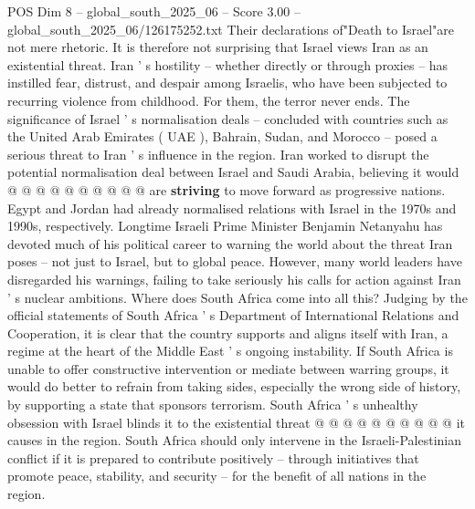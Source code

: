 \begin{textsample}{POS Dim 8 – global\_south\_2025\_06 – Score 3.00 – global\_south\_2025\_06/126175252.txt}
Their declarations of"Death to Israel"are not mere rhetoric.
It is therefore not surprising that Israel views Iran as an existential threat.
Iran ' s hostility -- whether directly or through proxies -- has instilled fear, distrust, and despair among Israelis, who have been subjected to recurring violence from childhood.
For them, the terror never ends.
The significance of Israel ' s normalisation deals -- concluded with countries such as the United Arab Emirates ( UAE ), Bahrain, Sudan, and Morocco -- posed a serious threat to Iran ' s influence in the region.
Iran worked to disrupt the potential normalisation deal between Israel and Saudi Arabia, believing it would @ @ @ @ @ @ @ @ @ @ are \textbf{striving} to move forward as progressive nations.
Egypt and Jordan had already normalised relations with Israel in the 1970s and 1990s, respectively.
Longtime Israeli Prime Minister Benjamin Netanyahu has devoted much of his political career to warning the world about the threat Iran poses -- not just to Israel, but to global peace.
However, many world leaders have disregarded his warnings, failing to take seriously his calls for action against Iran ' s nuclear ambitions.
Where does South Africa come into all this?
Judging by the official statements of South Africa ' s Department of International Relations and Cooperation, it is clear that the country supports and aligns itself with Iran, a regime at the heart of the Middle East ' s ongoing instability.
If South Africa is unable to offer constructive intervention or mediate between warring groups, it would do better to refrain from taking sides, especially the wrong side of history, by supporting a state that sponsors terrorism.
South Africa ' s unhealthy obsession with Israel blinds it to the existential threat @ @ @ @ @ @ @ @ @ @ it causes in the region.
South Africa should only intervene in the Israeli-Palestinian conflict if it is prepared to contribute positively -- through initiatives that promote peace, stability, and security -- for the benefit of all nations in the region.

\end{textsample}
